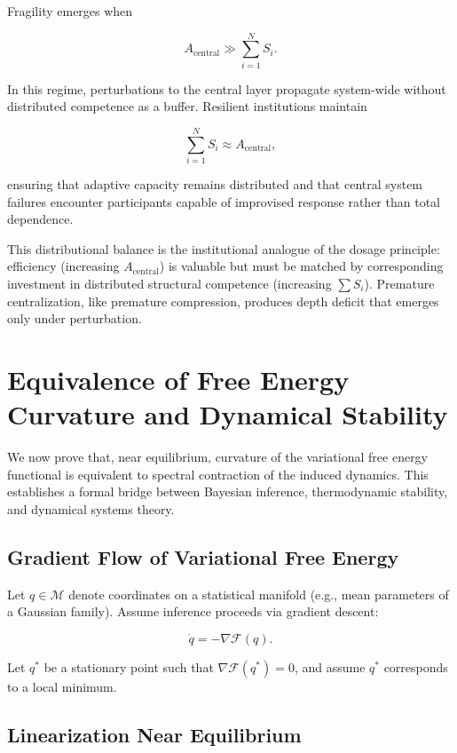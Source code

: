\documentclass[11pt]{article}
\theoremstyle{remark}
\begin{document}
Fragility emerges when

\[
A_{\text{central}} \gg \sum_{i=1}^N S_i.
\]

In this regime, perturbations to the central layer propagate system-wide without distributed competence as a buffer. Resilient institutions maintain

\[
\sum_{i=1}^N S_i \approx A_{\text{central}},
\]

ensuring that adaptive capacity remains distributed and that central system failures encounter participants capable of improvised response rather than total dependence.

This distributional balance is the institutional analogue of the dosage principle: efficiency (increasing $A_{\text{central}}$) is valuable but must be matched by corresponding investment in distributed structural competence (increasing $\sum S_i$). Premature centralization, like premature compression, produces depth deficit that emerges only under perturbation.

\section{Equivalence of Free Energy Curvature and Dynamical Stability}
\label{sec:hessian_jacobian}

We now prove that, near equilibrium, curvature of the variational free energy functional is equivalent to spectral contraction of the induced dynamics. This establishes a formal bridge between Bayesian inference, thermodynamic stability, and dynamical systems theory.

\subsection{Gradient Flow of Variational Free Energy}

Let $q \in \mathcal{M}$ denote coordinates on a statistical manifold (e.g., mean parameters of a Gaussian family). Assume inference proceeds via gradient descent:

\[
\dot{q} = - \nabla \mathcal{F}(q).
\]

Let $q^*$ be a stationary point such that $\nabla \mathcal{F}(q^*) = 0$, and assume $q^*$ corresponds to a local minimum.

\subsection{Linearization Near Equilibrium}
\end{document}

